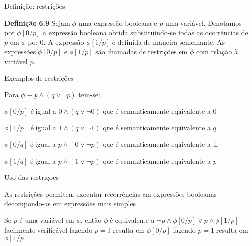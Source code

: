 \expandafter\documentclass\expandafter[table, usenames, svgnames, dvipsnames,14pt, \classopts]{beamer}
\begin{document}
\begin{frame}{Definição: restrições}

    \begin{block}{\textbf{Definição 6.9}}
        Sejam $\phi$ uma expressão booleana e $p$ uma variável. Denotamos por $\phi[0/p]$ a expressão booleana obtida substituindo-se todas as ocorrências de $p$ em $\phi$ por $0$. A expressão $\phi[1/p]$ é definida de maneira semelhante. As expressões $\phi[0/p]$ e $\phi[1/p]$ são chamadas de \underline{restrições} em $\phi$ com relação à variável $p$.
    \end{block}

\end{frame}

\begin{frame}{Exemplos de restrições}

    Para $\phi \equiv p \land (q \lor \lnot{p})$ tem-se:

    \begin{outline}
        \1 $\phi[0/p]$ é igual a $0 \land (q \lor \lnot{0})$
            \2[-] que é semanticamente equivalente a $0$
            
        \vspace{1em}
        
        \1 $\phi[1/p]$ é igual a $1 \land (q \lor \lnot{1})$
            \2[-] que é semanticamente equivalente a $q$
            
        \vspace{1em}
        
        \1 $\phi[0/q]$ é igual a $p \land (0 \lor \lnot{p})$
            \2[-] que é semanticamente equivalente a $\bot$
            
        \vspace{1em}
        
        \1 $\phi[1/q]$ é igual a $p \land (1 \lor \lnot{p})$
            \2[-] que é semanticamente equivalente a $p$
    \end{outline}
    
\end{frame}

\begin{frame}{Uso das restrições}

    \begin{outline}
        \1 As restrições permitem executar recorrências em expressões booleanas decompondo-as em expressões mais simples
        
        \vspace{1em}
        
        \1 Se $p$ é uma variável em $\phi$, então $\phi$ é equivalente a $\lnot{p} \land \phi[0/p] \lor p \land \phi[1/p]$
            \2[-] facilmente verificável
            \2[-] fazendo $p = 0$ resulta em $\phi[0/p]$
            \2[-] fazendo $p = 1$ resulta em $\phi[1/p]$
    \end{outline}

\end{frame}
\end{document}

